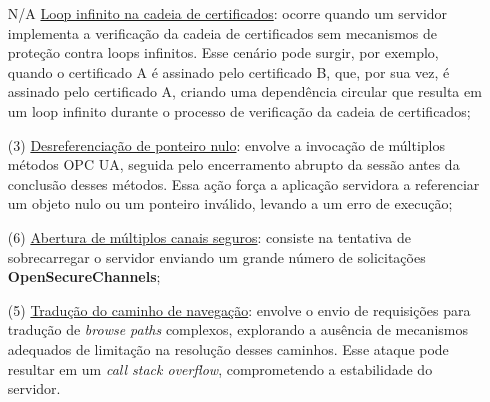         \begin{itemize}
            \item[N/A] \underline{Loop infinito na cadeia de certificados}: ocorre quando um servidor implementa a verificação da cadeia de certificados sem mecanismos de proteção contra loops infinitos. Esse cenário pode surgir, por exemplo, quando o certificado A é assinado pelo certificado B, que, por sua vez, é assinado pelo certificado A, criando uma dependência circular que resulta em um loop infinito durante o processo de verificação da cadeia de certificados;
            \item[(3)] \underline{Desreferenciação de ponteiro nulo}: envolve a invocação de múltiplos métodos OPC UA, seguida pelo encerramento abrupto da sessão antes da conclusão desses métodos. Essa ação força a aplicação servidora a referenciar um objeto nulo ou um ponteiro inválido, levando a um erro de execução;
            \item[(6)] \underline{Abertura de múltiplos canais seguros}: consiste na tentativa de sobrecarregar o servidor enviando um grande número de solicitações \textbf{OpenSecureChannels};
            \item[(5)] \underline{Tradução do caminho de navegação}: envolve o envio de requisições para tradução de \textit{browse paths} complexos, explorando a ausência de mecanismos adequados de limitação na resolução desses caminhos. Esse ataque pode resultar em um \textit{call stack overflow}, comprometendo a estabilidade do servidor.

\end{itemize}
